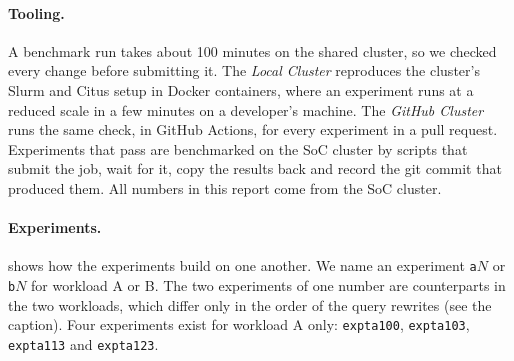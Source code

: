 \documentclass[sigconf,10pt,nonacm]{acmart}
\newcommand{\expt}[1]{\texttt{expt\textunderscore #1}}
\renewcommand{\_}{\underscorewithoutbreak\allowbreak}
\begin{document}
\paragraph{Tooling.} A benchmark run takes about 100 minutes on the shared cluster, so
we checked every change before submitting it. The \emph{Local Cluster} reproduces the
cluster's Slurm and Citus setup in Docker containers, where an experiment runs at a
reduced scale in a few minutes on a developer's machine. The \emph{GitHub Cluster} runs
the same check, in GitHub Actions, for every experiment in a pull request. Experiments
that pass are benchmarked on the SoC cluster by scripts that submit the job, wait for
it, copy the results back and record the git commit that produced them. All numbers in
this report come from the SoC cluster.

\paragraph{Experiments.}  shows how the experiments build on one
another. We name an experiment \texttt{a}$N$ or \texttt{b}$N$ for workload A or B. The
two experiments of one number are counterparts in the two workloads, which differ only
in the order of the query rewrites (see the caption). Four experiments exist for
workload A only: \expt{a100}, \expt{a103}, \expt{a113} and \expt{a123}.
\end{document}
